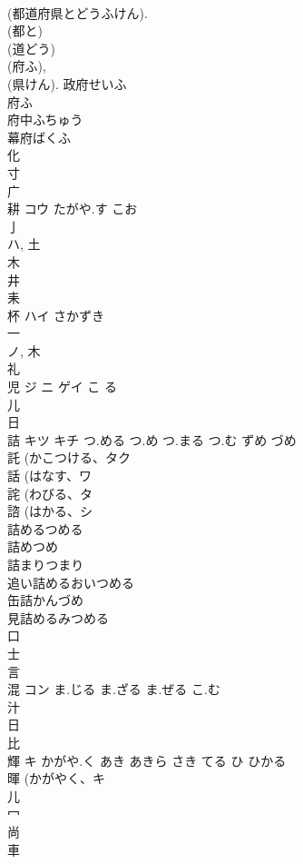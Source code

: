 \documentclass[8pt]{extreport}
\begin{document}
\begin{CJK}{UTF8}{min}
\\	(都道府県とどうふけん). 
\\	(都と) 
\\	(道どう) 
\\	(府ふ), 
\\	(県けん).	政府せいふ
\\	府ふ
\\	府中ふちゅう
\\	幕府ばくふ
\\	化 
\\	寸 
\\	广 
\\	耕	コウ	たがや.す こお	
\\	亅 
\\	ハ, 土 
\\	木 
\\	井 
\\	耒 
\\	杯	ハイ	さかずき	
\\	一 
\\	ノ, 木 
\\	礼 
\\	児	ジ ニ ゲイ	こ る	
\\	儿 
\\	日 
\\	詰	キツ キチ	つ.める つ.め つ.まる つ.む ずめ づめ	
\\	託 (かこつける、タク 
\\	話 (はなす、ワ 
\\	詫 (わびる、タ 
\\	諮 (はかる、シ 
\\	詰めるつめる
\\	詰めつめ
\\	詰まりつまり
\\	追い詰めるおいつめる
\\	缶詰かんづめ
\\	見詰めるみつめる
\\	口 
\\	士 
\\	言 
\\	混	コン	ま.じる ま.ざる ま.ぜる こ.む	
\\	汁 
\\	日 
\\	比 
\\	輝	キ	かがや.く あき あきら さき てる ひ ひかる	
\\	暉 (かがやく、キ 
\\	儿 
\\	冖 
\\	尚 
\\	車 

\end{CJK}
\end{document}
